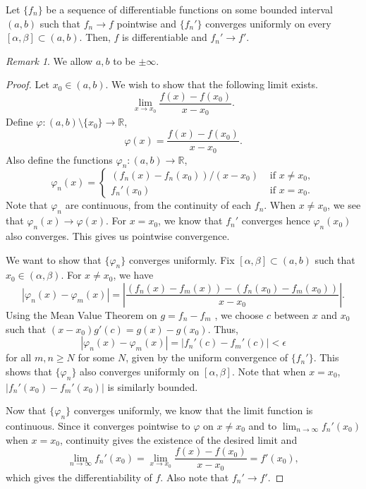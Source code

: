 \documentclass[11pt]{article}
\def\R{\mathbb{R}}
\theoremstyle{definition}
\theoremstyle{remark}
\newtheorem*{remark}{Remark}
\numberwithin{equation}{module}
\begin{document}
    \begin{theorem}
        Let $\{f_n\}$ be a sequence of differentiable functions on some bounded
        interval $(a, b)$ such that $f_n \to f$ pointwise and $\{f_n'\}$ converges
        uniformly on every $[\alpha, \beta] \subset (a, b)$.
        Then, $f$ is differentiable and $f_n' \to f'$.
        \begin{remark}
            We allow $a, b$ to be $\pm \infty$.
        \end{remark}
    \end{theorem}
    \begin{proof}
        Let $x_0 \in (a, b)$. We wish to show that the following limit exists. \[
            \lim_{x \to x_0} \frac{f(x) - f(x_0)}{x - x_0}.
        \] Define $\varphi\colon (a, b) \setminus \{x_0\} \to \R$, \[
            \varphi(x) = \frac{f(x) - f(x_0)}{x - x_0}.
        \] Also define the functions $\varphi_n\colon (a, b) \to \R$, \[
            \varphi_n(x) = \begin{cases}
                (f_n(x) - f_n(x_0))/(x - x_0) &\text{ if } x \neq x_0, \\
                f_n'(x_0) &\text{ if } x = x_0.
            \end{cases}
        \] Note that $\varphi_n$ are continuous, from the continuity of each $f_n$.
        When $x \neq x_0$, we see that $\varphi_n(x) \to \varphi(x)$. 
        For $x = x_0$, we know that $f_n'$ converges hence $\varphi_n(x_0)$ also 
        converges. This gives us pointwise convergence.

        We want to show that $\{\varphi_n\}$ converges uniformly. Fix $[\alpha,
        \beta] \subset (a, b)$ such that $x_0 \in (\alpha, \beta)$. For $x \neq
        x_0$, we have \[
            |\varphi_n(x) - \varphi_m(x)| = \left| \frac{(f_n(x) - f_m(x)) -
            (f_n(x_0) - f_m(x_0))}{x - x_0} \right|.
        \] Using the Mean Value Theorem on $g = f_n - f_m$ , we choose $c$ between $x$
        and $x_0$ such that $(x - x_0)g'(c) = g(x) - g(x_0)$. Thus, \[
            |\varphi_n(x) - \varphi_m(x)| = |f_n'(c) - f_m'(c)| < \epsilon
        \] for all $m, n \geq N$ for some $N$, given by the uniform convergence of
        $\{f_n'\}$. This shows that $\{\varphi_n\}$ also converges uniformly on
        $[\alpha, \beta]$. Note that when $x = x_0$, $|f_n'(x_0) - f_m'(x_0)|$ is
        similarly bounded.

        Now that $\{\varphi_n\}$ converges uniformly, we know that the limit
        function is continuous. Since it converges pointwise to $\varphi$ on $x \neq
        x_0$ and to $\lim_{n \to \infty} f_n'(x_0)$ when $x = x_0$, continuity gives
        the existence of the desired limit and \[
            \lim_{n \to \infty} f_n'(x_0) = \lim_{x \to x_0} \frac{f(x) - f(x_0)}{x
            - x_0} = f'(x_0),
        \] which gives the differentiability of $f$. Also note that $f_n' \to f'$.
    \end{proof}
\end{document}
